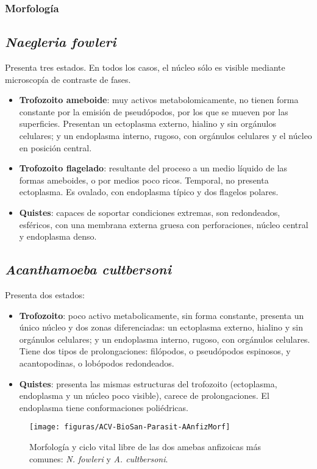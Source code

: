 \documentclass[10pt,a4paper,onecolumn,openany]{book}
\begin{document}
\subsubsection{Morfología}
\begin{multicols}{2}
	\subsection{\textit{Naegleria fowleri}}
	Presenta tres estados. En todos los casos, el núcleo sólo es visible mediante microscopía de contraste de fases.
	\begin{itemize}[itemsep=0pt,parsep=0pt,topsep=0pt,partopsep=0pt]
		\item\textbf{Trofozoito ameboide}: muy activos metabolomicamente, no tienen forma constante por la emisión de pseudópodos, por los que se mueven por las superficies. Presentan un ectoplasma externo, hialino y sin orgánulos celulares; y un endoplasma interno, rugoso, con orgánulos celulares y el núcleo en posición central.
		\item\textbf{Trofozoito flagelado}: resultante del proceso a un medio líquido de las formas ameboides, o por medios poco ricos. Temporal, no presenta ectoplasma. Es ovalado, con endoplasma típico y dos flagelos polares.
		\item\textbf{Quistes}: capaces de soportar condiciones extremas, son redondeados, esféricos, con una membrana externa gruesa con perforaciones, núcleo central y endoplasma denso.
	\end{itemize}
	\columnbreak
	\subsection{\textit{Acanthamoeba cultbersoni}}
	Presenta dos estados:
	\begin{itemize}[itemsep=0pt,parsep=0pt,topsep=0pt,partopsep=0pt]
		\item\textbf{Trofozoito}: poco activo metabolicamente, sin forma constante, presenta un único núcleo y dos zonas diferenciadas: un ectoplasma externo, hialino y sin orgánulos celulares; y un endoplasma interno, rugoso, con orgánulos celulares. Tiene dos tipos de prolongaciones: filópodos, o pseudópodos espinosos, y acantopodinas, o lobópodos redondeados.
		\item\textbf{Quistes}: presenta las mismas estructuras del trofozoito (ectoplasma, endoplasma y un núcleo poco visible), carece de prolongaciones. El endoplasma tiene conformaciones poliédricas.
	\end{itemize}
\end{multicols}
\begin{figure}[H]
	\centering
	\texttt{[image: figuras/ACV-BioSan-Parasit-AAnfizMorf]}
	\caption{Morfología y ciclo vital libre de las dos amebas anfizoicas más comunes: \textit{N. fowleri} y \textit{A. cultbersoni}.\label{fig:PARASIT:AAnfizMorf}}
\end{figure}
\end{document}
